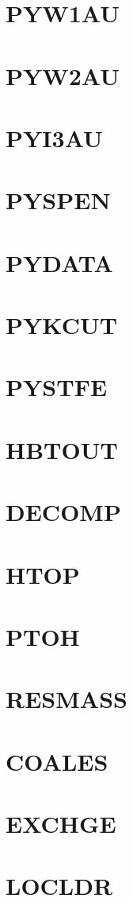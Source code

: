 \documentclass[10pt,UTF8]{ctexbook}
\begin{document}
\section{PYW1AU}
\section{PYW2AU}
\section{PYI3AU}
\section{PYSPEN}
\section{PYDATA}
\section{PYKCUT}
\section{PYSTFE}
\section{HBTOUT}
\section{DECOMP}
\section{HTOP}
\section{PTOH}
\section{RESMASS}
\section{COALES}
\section{EXCHGE}
\section{LOCLDR}
\end{document}
